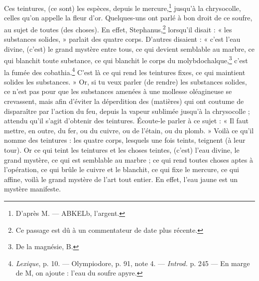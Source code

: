 \documentclass[landscape, a4paper, 11pt, oneside, polutonikogreek, french]{article}
\begin{document}
Ces teintures, (ce sont) les espèces, depuis le mercure,\footnote{D'après M. --- ABKELb, l'argent.} jusqu'à la chrysocolle, celles qu'on appelle la fleur d'or. Quelques-uns ont parlé à bon droit de ce soufre, au sujet de toutes (des choses). En effet, Stephanus,\footnote{Ce passage est dû à un commentateur de date plus récente.} lorsqu'il disait : « les substances solides, » parlait des quatre corps. D'autres disaient : « c'est l'eau divine, (c'est) le grand mystère entre tous, ce qui devient semblable au marbre, ce qui blanchit toute substance, ce qui blanchit le corps du molybdochalque,\footnote{De la magnésie, B.} c'est la fumée des cobathia.\footnote{\emph{Lexique}, p. 10. --- Olympiodore, p. 91, note 4. --- \emph{Introd.} p. 245 --- En marge de M, on ajoute : l'eau du soufre apyre.} C'est là ce qui rend les teintures fixes, ce qui maintient solides les substances. » Or, si tu veux parler (de rendre) les substances solides, ce n'est pas pour que les substances amenées à une mollesse oléagineuse se crevassent, mais afin d'éviter la déperdition des (matières) qui ont coutume de disparaître par l'action du feu, depuis la vapeur sublimée jusqu'à la chrysocolle ; attendu qu'il s'agit d'obtenir des teintures. Écoute-le parler à ce sujet : « Il faut mettre, en outre, du fer, ou du cuivre, ou de l'étain, ou du plomb. » Voilà ce qu'il nomme des teintures : les quatre corps, lesquels une fois teints, teignent (à leur tour). Or ce qui teint les teintures et les choses teintes, (c'est) l'eau divine, le grand mystère, ce qui est semblable au marbre ; ce qui rend toutes choses aptes à l'opération, ce qui brûle le cuivre et le blanchit, ce qui fixe le mercure, ce qui affine, voilà le grand mystère de l'art tout entier. En effet, l'eau jaune est un mystère manifeste.
\end{document}
